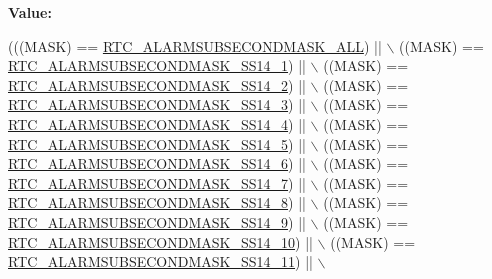 {\bfseries Value\+:}
\begin{DoxyCode}
(((MASK) == \hyperlink{group___r_t_c___alarm___sub___seconds___masks___definitions_gaf96ae2bcfc62e92473372c4510d517d5}{RTC\_ALARMSUBSECONDMASK\_ALL}) || \(\backslash\)
                                              ((MASK) == 
      \hyperlink{group___r_t_c___alarm___sub___seconds___masks___definitions_ga382ddfaca27c4b547c69878a320aab43}{RTC\_ALARMSUBSECONDMASK\_SS14\_1}) || \(\backslash\)
                                              ((MASK) == 
      \hyperlink{group___r_t_c___alarm___sub___seconds___masks___definitions_gad627f4e6c83537e1d5b8c657f91d6bcf}{RTC\_ALARMSUBSECONDMASK\_SS14\_2}) || \(\backslash\)
                                              ((MASK) == 
      \hyperlink{group___r_t_c___alarm___sub___seconds___masks___definitions_gaeb5fb21c4ef0d54ca1515564563c0487}{RTC\_ALARMSUBSECONDMASK\_SS14\_3}) || \(\backslash\)
                                              ((MASK) == 
      \hyperlink{group___r_t_c___alarm___sub___seconds___masks___definitions_ga6f9b0a78f9723a20b1f94b5581e04194}{RTC\_ALARMSUBSECONDMASK\_SS14\_4}) || \(\backslash\)
                                              ((MASK) == 
      \hyperlink{group___r_t_c___alarm___sub___seconds___masks___definitions_gafc0252b2f8a935811dadd3d6b8ea3574}{RTC\_ALARMSUBSECONDMASK\_SS14\_5}) || \(\backslash\)
                                              ((MASK) == 
      \hyperlink{group___r_t_c___alarm___sub___seconds___masks___definitions_ga60fab8d647e6f8500926a0db2dff94d8}{RTC\_ALARMSUBSECONDMASK\_SS14\_6}) || \(\backslash\)
                                              ((MASK) == 
      \hyperlink{group___r_t_c___alarm___sub___seconds___masks___definitions_gac0f57cb99c0a40708e3dd44eafa7f8e6}{RTC\_ALARMSUBSECONDMASK\_SS14\_7}) || \(\backslash\)
                                              ((MASK) == 
      \hyperlink{group___r_t_c___alarm___sub___seconds___masks___definitions_ga0f7cdfed3ad8bbe33fc2c4c2b8d5d2ce}{RTC\_ALARMSUBSECONDMASK\_SS14\_8}) || \(\backslash\)
                                              ((MASK) == 
      \hyperlink{group___r_t_c___alarm___sub___seconds___masks___definitions_ga173d153f6543cd34062d8ca14fb04975}{RTC\_ALARMSUBSECONDMASK\_SS14\_9}) || \(\backslash\)
                                              ((MASK) == 
      \hyperlink{group___r_t_c___alarm___sub___seconds___masks___definitions_ga7cb4d4abdac134b508cbb6e9b5d21638}{RTC\_ALARMSUBSECONDMASK\_SS14\_10}) || \(\backslash\)
                                              ((MASK) == 
      \hyperlink{group___r_t_c___alarm___sub___seconds___masks___definitions_gaf67fcaa5c58e46e47d97be746c9dec24}{RTC\_ALARMSUBSECONDMASK\_SS14\_11}) || \(\backslash\)

\end{DoxyCode}
